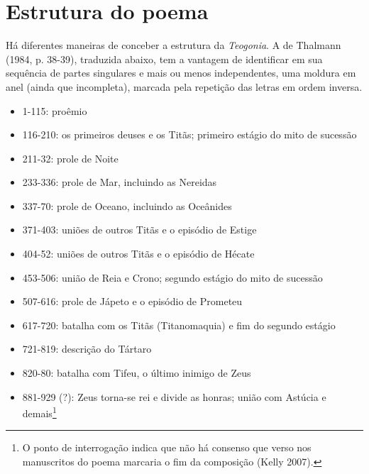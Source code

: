 \section{Estrutura do poema}

Há diferentes maneiras de conceber a estrutura da \emph{Teogonia}. A de
Thalmann (1984, p. 38-39), traduzida abaixo, tem a vantagem de
identificar em sua sequência de partes singulares e mais ou menos
independentes, uma moldura em anel (ainda que incompleta), marcada pela
repetição das letras em ordem inversa.

\begin{itemize}
\item[a.] 1-115: proêmio

\item[b.] 116-210: os primeiros deuses e os Titãs; primeiro estágio do mito de sucessão

\item[c.] 211-32: prole de Noite

\item[d-1.] 233-336: prole de Mar, incluindo as Nereidas

\item[d-2.] 337-70: prole de Oceano, incluindo as Oceânides

\item[e-1.] 371-403: uniões de outros Titãs e o episódio de Estige

\item[e-2.] 404-52: uniões de outros Titãs e o episódio de Hécate

\item[f-1.] 453-506: união de Reia e Crono; segundo estágio do mito de sucessão

\item[g.] 507-616: prole de Jápeto e o episódio de Prometeu

\item[f-2.] 617-720: batalha com os Titãs (Titanomaquia) e fim do segundo estágio

\item[c.] 721-819: descrição do Tártaro

\item[b.] 820-80: batalha com Tifeu, o último inimigo de Zeus

\item[a.] 881-929 (?): Zeus torna-se rei e divide as honras; união com Astúcia
e demais\footnote{O ponto de interrogação indica que não há consenso que
  verso nos manuscritos do poema marcaria o fim da composição (Kelly
  2007).}
\end{itemize}

